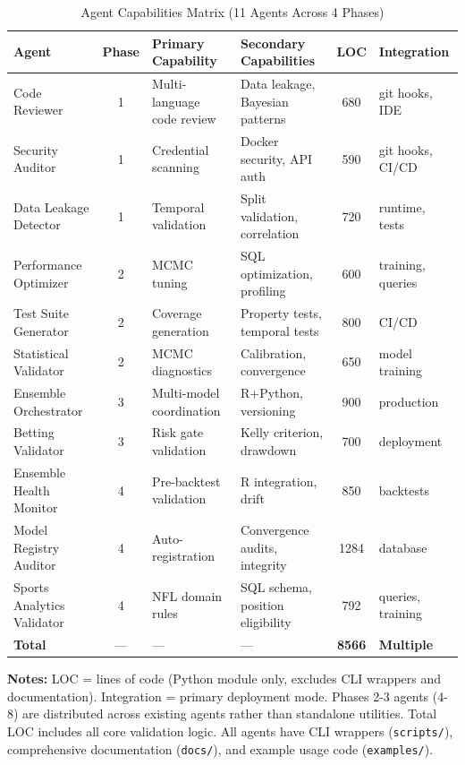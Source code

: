 \begin{table}[htbp]
\centering
\caption{Agent Capabilities Matrix (11 Agents Across 4 Phases)}
\label{tab:agent-capabilities}
\scriptsize
\begin{adjustbox}{width=\linewidth}
\begin{tabular}{@{} l c l l S[table-format=4.0] l @{}}
\toprule
\textbf{Agent} & \textbf{Phase} & \textbf{Primary Capability} & \textbf{Secondary Capabilities} & \textbf{LOC} & \textbf{Integration} \\
\midrule
Code Reviewer & 1 & Multi-language code review & Data leakage, Bayesian patterns & 680 & git hooks, IDE \\
Security Auditor & 1 & Credential scanning & Docker security, API auth & 590 & git hooks, CI/CD \\
Data Leakage Detector & 1 & Temporal validation & Split validation, correlation & 720 & runtime, tests \\
\baselinerule
Performance Optimizer & 2 & MCMC tuning & SQL optimization, profiling & 600 & training, queries \\
Test Suite Generator & 2 & Coverage generation & Property tests, temporal tests & 800 & CI/CD \\
Statistical Validator & 2 & MCMC diagnostics & Calibration, convergence & 650 & model training \\
\baselinerule
Ensemble Orchestrator & 3 & Multi-model coordination & R+Python, versioning & 900 & production \\
Betting Validator & 3 & Risk gate validation & Kelly criterion, drawdown & 700 & deployment \\
\baselinerule
Ensemble Health Monitor & 4 & Pre-backtest validation & R integration, drift & 850 & backtests \\
Model Registry Auditor & 4 & Auto-registration & Convergence audits, integrity & 1284 & database \\
Sports Analytics Validator & 4 & NFL domain rules & SQL schema, position eligibility & 792 & queries, training \\
\baselinerule
\textbf{Total} & --- & --- & --- & \textbf{8566} & \textbf{Multiple} \\
\bottomrule
\end{tabular}
\end{adjustbox}
\begin{tablenotes}
\item \textbf{Notes:} LOC = lines of code (Python module only, excludes CLI wrappers and documentation). Integration = primary deployment mode. Phases 2-3 agents (4-8) are distributed across existing agents rather than standalone utilities. Total LOC includes all core validation logic. All agents have CLI wrappers (\texttt{scripts/}), comprehensive documentation (\texttt{docs/}), and example usage code (\texttt{examples/}).
\end{tablenotes}
\end{table}

